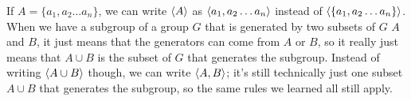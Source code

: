 \documentclass[12pt]{article}
\begin{document}
    If $A = \{ a_1, a_2 \dots a_n\}$,
    we can write $\left\langle A \right\rangle$ as $\left\langle a_1, a_2 \dots a_n \right\rangle$
    instead of $\left\langle  \{a_1, a_2 \dots a_n\} \right\rangle$. \\
    When we have a subgroup of a group $G$
    that is generated by two subsets of $G$ $A$ and $B$,
    it just means that the generators can come from $A$
    or $B$,
    so it really just means that $A \cup B$
    is the subset of $G$ that generates the subgroup.
    Instead of writing $\left\langle A \cup B \right\rangle$ though,
    we can write $\left\langle A, B \right\rangle$;
    it's still technically just one subset
    $A \cup B$ that generates the subgroup,
    so the same rules we learned all still apply. \\ 
\end{document}
